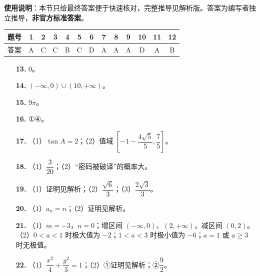 
\begin{gknotice}
\textbf{使用说明}：本节只给最终答案便于快速核对，完整推导见解析版。答案为编写者独立推导，\textbf{非官方标准答案}。
\end{gknotice}

\begin{center}\begin{tabular}{ccccccccccccc}
\toprule
题号 & 1 & 2 & 3 & 4 & 5 & 6 & 7 & 8 & 9 & 10 & 11 & 12 \\
\midrule
答案 & A & C & C & B & C & D & A & A & A & D & A & B \\
\bottomrule
\end{tabular}\end{center}

\begin{itemize}[leftmargin=2.6em]
  \item[\textbf{13.}] 0。
  \item[\textbf{14.}] $(-\infty,0)\cup(10,+\infty)$。
  \item[\textbf{15.}] $9\pi$。
  \item[\textbf{16.}] ①④。
\end{itemize}

\begin{itemize}[leftmargin=2.6em]
  \item[\textbf{17.}] （1）$\tan A=2$；（2）值域 $\left[-1-\dfrac{4\sqrt5}5,\dfrac75\right]$。
  \item[\textbf{18.}] （1）$\dfrac3{20}$；（2）“密码被破译”的概率大。
  \item[\textbf{19.}] （1）证明见解析；（2）$\dfrac{\sqrt6}3$；（3）$\dfrac{2\sqrt3}3$。
  \item[\textbf{20.}] （1）$a_n=n$；（2）证明见解析。
  \item[\textbf{21.}] （1）$m=-3$，$n=0$；增区间 $(-\infty,0)$、$(2,+\infty)$，减区间 $(0,2)$。（2）$0<a<1$ 时极大值为 $-2$；$1<a<3$ 时极小值为 $-6$；$a=1$ 或 $a\geqslant3$ 时无极值。
  \item[\textbf{22.}] （1）$\dfrac{x^2}4+\dfrac{y^2}3=1$；（2）①证明见解析；②$\dfrac92$。
\end{itemize}
